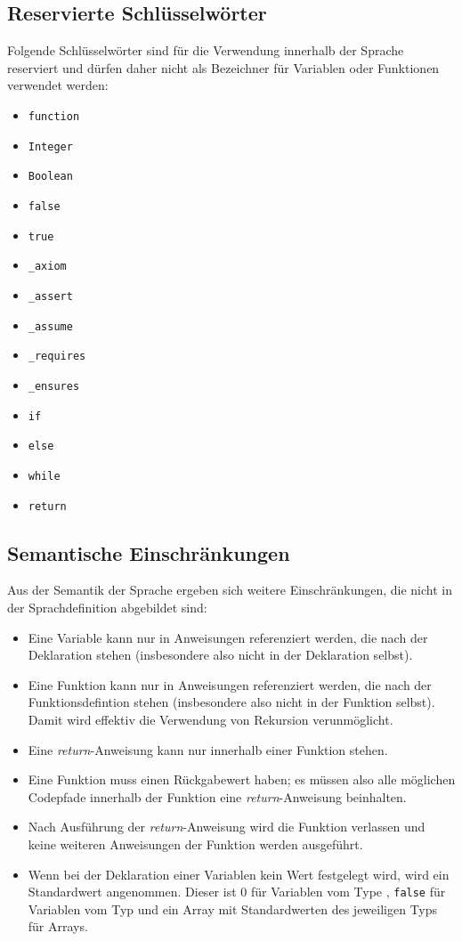 \subsection{Reservierte Schlüsselwörter}

Folgende Schlüsselwörter sind für die Verwendung innerhalb der Sprache reserviert und dürfen daher nicht als Bezeichner für Variablen oder Funktionen verwendet werden:

\begin{itemize}
	\item \texttt{function}
	\item \texttt{Integer}
	\item \texttt{Boolean}
	\item \texttt{false}
	\item \texttt{true}	
	\item \texttt{\_axiom}
	\item \texttt{\_assert}
	\item \texttt{\_assume}
	\item \texttt{\_requires}
	\item \texttt{\_ensures}
	\item \texttt{if}
	\item \texttt{else}	
	\item \texttt{while}		
	\item \texttt{return}	
\end{itemize}

\subsection{Semantische Einschränkungen}
Aus der Semantik der Sprache ergeben sich weitere Einschränkungen, die nicht in der Sprachdefinition abgebildet sind:

\begin{itemize}
	\item Eine Variable kann nur in Anweisungen referenziert werden, die nach der Deklaration stehen (insbesondere also nicht in der Deklaration selbst).
	\item Eine Funktion kann nur in Anweisungen referenziert werden, die nach der Funktionsdefintion stehen (insbesondere also nicht in der Funktion selbst). Damit wird effektiv die Verwendung von Rekursion verunmöglicht.
	\item Eine \textit{return}-Anweisung kann nur innerhalb einer Funktion stehen.
	\item Eine Funktion muss einen Rückgabewert haben; es müssen also alle möglichen Codepfade innerhalb der Funktion eine \textit{return}-Anweisung beinhalten.
	\item Nach Ausführung der \textit{return}-Anweisung wird die Funktion verlassen und keine weiteren Anweisungen der Funktion werden ausgeführt.
	\item Wenn bei der Deklaration einer Variablen kein Wert festgelegt wird, wird ein Standardwert angenommen. Dieser ist 0 für Variablen vom Type \int{}, \texttt{false} für Variablen vom Typ \bool{} und ein Array mit Standardwerten des jeweiligen Typs für Arrays.
\end{itemize}

